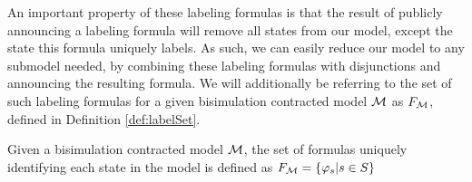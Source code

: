 An important property of these labeling formulas is that the result of publicly announcing a labeling formula will remove all states from our model, except the state this formula uniquely labels. As such, we can easily reduce our model to any submodel needed, by combining these labeling formulas with disjunctions and announcing the resulting formula. We will additionally be referring to the set of such labeling formulas for a given bisimulation contracted model $\mathcal{M}$ as $F_{\mathcal{M}}$, defined in Definition \ref{def:labelSet}.

\begin{definition}
	\label{def:labelSet}
	Given a bisimulation contracted model $\mathcal{M}$, the set of formulas uniquely identifying each state in the model is defined as $F_{\mathcal{M}} = \{\varphi_s | s \in S\}$
\end{definition}


